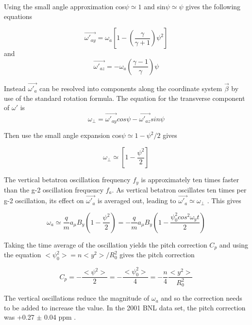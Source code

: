 \noindent
Using the small angle approximation cos$\psi \simeq 1$ and sin$\psi \simeq \psi$ gives the following equations

\begin{equation}
\vec{\omega'_{ay}}=\omega_{a}[1-(\frac{\gamma}{\gamma + 1})\psi^2]
\end{equation}
\noindent
and
\begin{equation}
\vec{\omega'_{az}}=-\omega_{a}(\frac{\gamma - 1}{\gamma})\psi
\end{equation}

Instead $\vec{\omega'_{a}}$ can be resolved into components along the coordinate system $\vec{\beta}$ by use of the standard rotation formula. The equation for the transverse component of $\omega'$ is 
\begin{equation}
\omega_{\perp}=\vec{\omega'_{ay}}cos{\psi}-\vec{\omega'_{az}}{sin}\psi
\end{equation}

\noindent
Then use the small angle expansion cos$\psi \simeq 1 - \psi^{2}/2$ gives

\begin{equation}
\omega_{\perp} \simeq [1 - \frac{\psi^2}{2}]
\end{equation}

The vertical betatron oscillation frequency $f_{y}$ is approximately ten times faster than the g-2 oscillation frequency $f_{a}$. As vertical betatron oscillates ten times per g-2 oscillation, its effect on $\vec{\omega'_{a}}$ is averaged out, leading to $\vec{\omega'_{a}} \simeq \omega_{\perp}$ \cite{Reference1}. This gives

\begin{equation}
\omega_{a}\simeq \frac{q}{m}a_{\mu}B_{y}(1 - \frac{\psi^2}{2}) = - \frac{q}{m}a_{\mu}B_{y}(1 - \frac{\psi^{2}_{0}cos^{2}\omega_{y}t}{2})
\end{equation}

\noindent
Taking the time average of the oscillation yields the pitch correction $C_{p}$ and using the equation $<\psi^{2}_{0}> = n<y^{2}>/R^{2}_{0}$ gives the pitch correction 

\begin{equation}
C_{p} = - \frac{<\psi^2>}{2} = - \frac{<\psi^{2}_{0}>}{4} = - \frac{n}{4}\frac{<y^{2}>}{R^{2}_0}
\end{equation}

The vertical oscillations reduce the magnitude of $\omega_{a}$ and so the correction needs to be added to increase the value. In the 2001 BNL data set, the pitch correction was +0.27 $\pm$ 0.04 ppm \cite{Reference13}.

